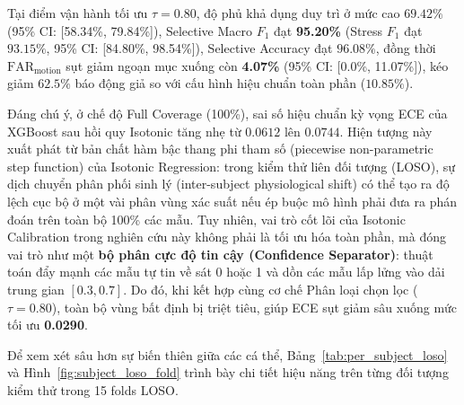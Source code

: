 \documentclass[conference]{IEEEtran}
\begin{document}
Tại điểm vận hành tối ưu $\tau = 0.80$, độ phủ khả dụng duy trì ở mức cao $69.42\%$ (95\% CI: [58.34\%, 79.84\%]), Selective Macro $F_1$ đạt \textbf{95.20\%} (Stress $F_1$ đạt $93.15\%$, 95\% CI: [84.80\%, 98.54\%]), Selective Accuracy đạt $96.08\%$, đồng thời $\text{FAR}_{\text{motion}}$ sụt giảm ngoạn mục xuống còn \textbf{4.07\%} (95\% CI: [0.0\%, 11.07\%]), kéo giảm $62.5\%$ báo động giả so với cấu hình hiệu chuẩn toàn phần ($10.85\%$). 

Đáng chú ý, ở chế độ Full Coverage (100\%), sai số hiệu chuẩn kỳ vọng ECE của XGBoost sau hồi quy Isotonic tăng nhẹ từ $0.0612$ lên $0.0744$. Hiện tượng này xuất phát từ bản chất hàm bậc thang phi tham số (piecewise non-parametric step function) của Isotonic Regression: trong kiểm thử liên đối tượng (LOSO), sự dịch chuyển phân phối sinh lý (inter-subject physiological shift) có thể tạo ra độ lệch cục bộ ở một vài phân vùng xác suất nếu ép buộc mô hình phải đưa ra phán đoán trên toàn bộ 100\% các mẫu. Tuy nhiên, vai trò cốt lõi của Isotonic Calibration trong nghiên cứu này không phải là tối ưu hóa toàn phần, mà đóng vai trò như một \textbf{bộ phân cực độ tin cậy (Confidence Separator)}: thuật toán đẩy mạnh các mẫu tự tin về sát 0 hoặc 1 và dồn các mẫu lấp lửng vào dải trung gian $[0.3, 0.7]$. Do đó, khi kết hợp cùng cơ chế Phân loại chọn lọc ($\tau = 0.80$), toàn bộ vùng bất định bị triệt tiêu, giúp ECE sụt giảm sâu xuống mức tối ưu \textbf{0.0290}.

Để xem xét sâu hơn sự biến thiên giữa các cá thể, Bảng~\ref{tab:per_subject_loso} và Hình~\ref{fig:subject_loso_fold} trình bày chi tiết hiệu năng trên từng đối tượng kiểm thử trong 15 folds LOSO.
\end{document}
